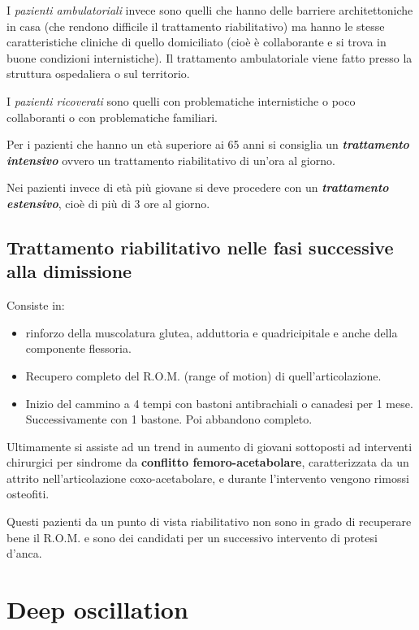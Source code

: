 I \emph{pazienti ambulatoriali} invece sono quelli che hanno delle
barriere architettoniche in casa (che rendono difficile il trattamento
riabilitativo) ma hanno le stesse caratteristiche cliniche di quello
domiciliato (cioè è collaborante e si trova in buone condizioni
internistiche). Il trattamento ambulatoriale viene fatto presso la
struttura ospedaliera o sul territorio.

I \emph{pazienti ricoverati} sono quelli con problematiche internistiche
o poco collaboranti o con problematiche familiari.

Per i pazienti che hanno un età superiore ai 65 anni si consiglia un
\emph{\textbf{trattamento intensivo}} ovvero un trattamento
riabilitativo di un'ora al giorno.

Nei pazienti invece di età più giovane si deve procedere con un
\emph{\textbf{trattamento estensivo}}, cioè di più di 3 ore al giorno.

\subsection{Trattamento riabilitativo nelle fasi successive alla dimissione}


Consiste in:

\begin{itemize}
\item
  rinforzo della muscolatura glutea, adduttoria e quadricipitale e anche
  della componente flessoria.
\item
  Recupero completo del R.O.M. (range of motion) di quell'articolazione.
\item
  Inizio del cammino a 4 tempi con bastoni antibrachiali o canadesi per
  1 mese. Successivamente con 1 bastone. Poi abbandono completo.
\end{itemize}

Ultimamente si assiste ad un trend in aumento di giovani sottoposti ad
interventi chirurgici per sindrome da \textbf{conflitto
femoro-acetabolare}, caratterizzata da un attrito nell'articolazione
coxo-acetabolare, e durante l'intervento vengono rimossi osteofiti.

Questi pazienti da un punto di vista riabilitativo non sono in grado di
recuperare bene il R.O.M. e sono dei candidati per un successivo
intervento di protesi d'anca.

\section{Deep oscillation}


